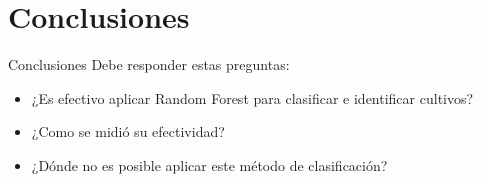 \section{Conclusiones}

\begin{frame}{Conclusiones}
	Debe responder estas preguntas:
	\begin{itemize}
		\item ¿Es efectivo aplicar Random Forest para clasificar e identificar cultivos?
		\item ¿Como se midió su efectividad?
		\item ¿Dónde no es posible aplicar este método de clasificación?
		
	\end{itemize}
\end{frame}

